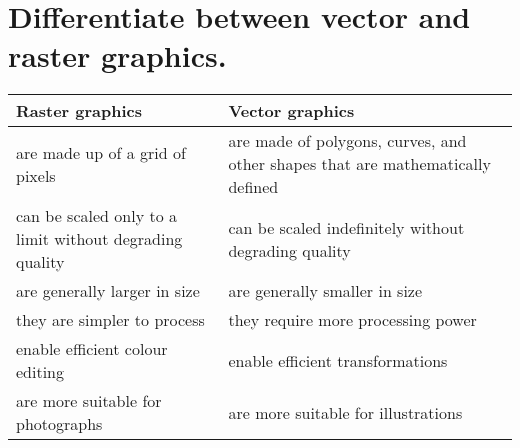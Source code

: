 \documentclass[a4paper,14pt,english,crop=false]{standalone}
\begin{document}
\section{Differentiate between vector and raster graphics.}
\begin{tabulary}{\textwidth}{L L}
  \centering
  Raster graphics & Vector graphics \\
  \midrule
  are made up of a grid of pixels &
  are made of polygons, curves, and other shapes that are mathematically
  defined \\
  can be scaled only to a limit without degrading quality &
  can be scaled indefinitely without degrading quality \\
  are generally larger in size & are generally smaller in size \\
  they are simpler to process & they require more processing power \\
  enable efficient colour editing & enable efficient transformations \\
  are more suitable for photographs & are more suitable for illustrations \\
\end{tabulary}
\end{document}
